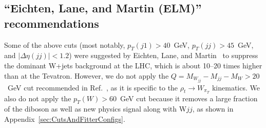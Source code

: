\subsection{``Eichten, Lane, and Martin (ELM)'' recommendations}
\label{sec:elmrecommendations}
Some of the above cuts (most notably, $p_T(j1)>40$~GeV, 
$p_T(jj)>45$~GeV, and $|\Delta\eta (jj)|<1.2$) were suggested 
by Eichten, Lane, and Martin~\cite{ELM} to suppress the dominant 
W+jets background at the LHC, which is about 10--20 times higher 
than at the Tevatron. 
However, we do not apply the $Q = M_{W_{jj}} - M_{jj} - M_W > 20$~GeV cut recommended 
in Ref.~\cite{ELM}, as it is specific to the $\rho_t\to W_{\pi_T}$ 
kinematics. 
We also do not apply the $p_T(W)>60$~GeV cut because it removes 
a large fraction of the diboson as well as new physics signal 
along with W$jj$, as shown in Appendix~\ref{sec:CutsAndFitterConfigs}.

